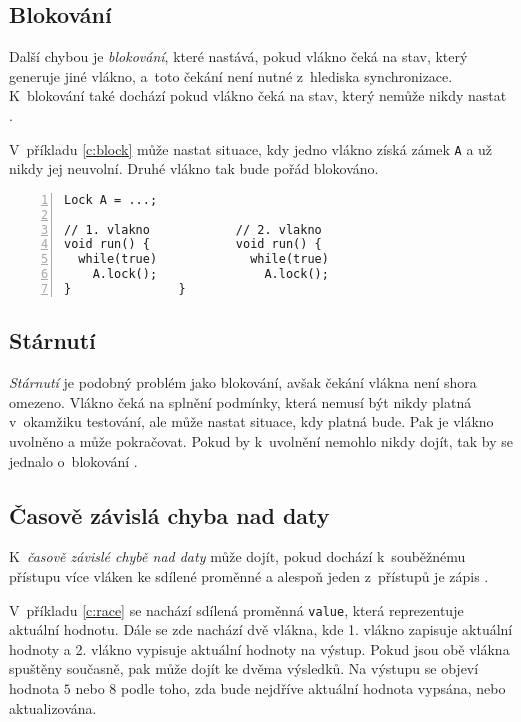 \subsection{Blokování}

Další chybou je \textit{blokování}, které nastává, pokud vlákno čeká na stav, který generuje jiné vlákno, a~toto čekání není nutné z~hlediska synchronizace. K~blokování také dochází pokud vlákno čeká na stav, který nemůže nikdy nastat \cite{cite:OS2}.

V~příkladu \ref{c:block} může nastat situace, kdy jedno vlákno získá zámek \texttt{A} a už nikdy jej neuvolní. Druhé vlákno tak bude pořád blokováno.

\begin{lstlisting}[caption=Pseudokód příkladu blokování dvou vláken., frame=none, label={c:block}, numbers=left, xleftmargin=1cm]
Lock A = ...;

// 1. vlakno			// 2. vlakno
void run() {			void run() {
  while(true)			  while(true)
    A.lock();			    A.lock();
}				}
\end{lstlisting}

\subsection{Stárnutí}

\textit{Stárnutí} je podobný problém jako blokování, avšak čekání vlákna není shora omezeno. Vlákno čeká na splnění podmínky, která nemusí být nikdy platná v~okamžiku testování, ale může nastat situace, kdy platná bude. Pak je vlákno uvolněno a může pokračovat. Pokud by k~uvolnění nemohlo nikdy dojít, tak by se jednalo o~blokování \cite{cite:OS2}.

\subsection{Časově závislá chyba nad daty}\label{data-race}

K~\textit{časově závislé chybě nad daty} může dojít, pokud dochází k~souběžnému přístupu více vláken ke sdílené proměnné a alespoň jeden z~přístupů je zápis \cite{cite:OS2}.

V~příkladu \ref{c:race} se nachází sdílená proměnná \texttt{value}, která reprezentuje aktuální hodnotu. Dále se zde nachází dvě vlákna, kde 1. vlákno zapisuje aktuální hodnoty a 2. vlákno vypisuje aktuální hodnoty na výstup. Pokud jsou obě vlákna spuštěny současně, pak může dojít ke dvěma výsledků. Na výstupu se objeví hodnota $5$ nebo $8$ podle toho, zda bude nejdříve aktuální hodnota vypsána, nebo aktualizována.

